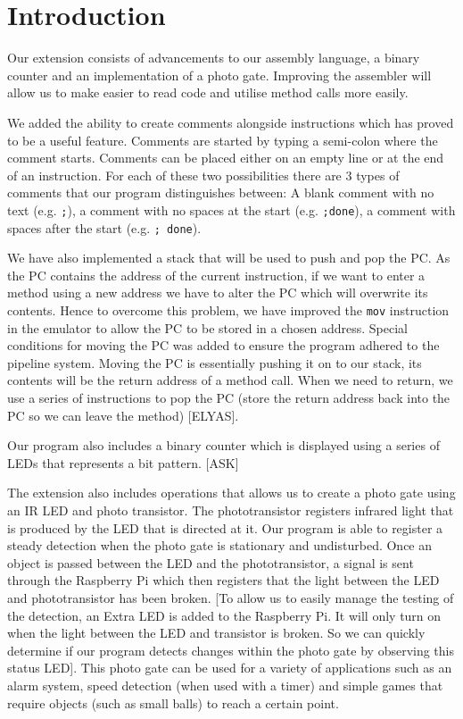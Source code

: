 \documentclass[11pt]{article}
\begin{document}
\section{Introduction}

Our extension consists of advancements to our assembly language, a binary counter and an implementation of a photo gate. Improving the assembler will allow us to make easier to read code and utilise method calls more easily.\newline

\noindent We added the ability to create comments alongside instructions which has proved to be a useful feature. Comments are started by typing a semi-colon where the comment starts. Comments can be placed either on an empty line or at the end of an instruction. For each of these two possibilities there are 3 types of comments that our program distinguishes between: A blank comment with no text (e.g. \texttt{;}), a comment with no spaces at the start (e.g. \texttt{;done}),  a comment with spaces after the start (e.g. \texttt{; done}).\newline

\noindent We have also implemented a stack that will be used to push and pop the PC. As the PC contains the address of the current instruction, if we want to enter a method using a new address we have to alter the PC which will overwrite its contents. Hence to overcome this problem, we have improved the \texttt{mov} instruction in the emulator to allow the PC to be stored in a chosen address. Special conditions for moving the PC was added to ensure the program adhered to the pipeline system.  Moving the PC is essentially pushing it on to our stack, its contents will be the return address of a method call. When we need to return, we use a series of instructions to pop the PC (store the return address back into the PC so we can leave the method) [ELYAS].\newline

\noindent Our program also includes a binary counter which is displayed using a series of LEDs that represents a bit pattern. [ASK]\newline

\noindent The extension also includes operations that allows us to create a photo gate using an IR LED and photo transistor. The phototransistor registers infrared light that is produced by the LED that is directed at it. Our program is able to register a steady detection when the photo gate is stationary and undisturbed. Once an object is passed between the LED and the phototransistor, a signal is sent through the Raspberry Pi which then registers that the light between the LED and phototransistor has been broken. [To allow us to easily manage the testing of the detection, an Extra LED is added to the Raspberry Pi. It will only turn on when the light between the LED and transistor is broken. So we can quickly determine if our program detects changes within the photo gate by observing this status LED]. This photo gate can be used for a variety of applications such as an alarm system, speed detection (when used with a timer) and simple games that require objects (such as small balls) to reach a certain point.
\end{document}
